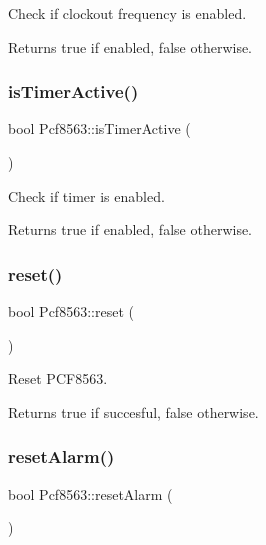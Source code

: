 Check if clockout frequency is enabled. 

\begin{DoxyReturn}{Returns}
true if enabled, false otherwise. 
\end{DoxyReturn}
\mbox{\label{namespacePcf8563_aab079fef811171abcba7e80b8595a8d1}} 
\subsubsection{\texorpdfstring{is\+Timer\+Active()}{isTimerActive()}}
{\footnotesize\ttfamily bool Pcf8563\+::is\+Timer\+Active (\begin{DoxyParamCaption}{ }\end{DoxyParamCaption})}



Check if timer is enabled. 

\begin{DoxyReturn}{Returns}
true if enabled, false otherwise. 
\end{DoxyReturn}
\mbox{\label{namespacePcf8563_abe54082b4f23e40ef4f5be845b5cf008}} 
\subsubsection{\texorpdfstring{reset()}{reset()}}
{\footnotesize\ttfamily bool Pcf8563\+::reset (\begin{DoxyParamCaption}{ }\end{DoxyParamCaption})}



Reset P\+C\+F8563. 

\begin{DoxyReturn}{Returns}
true if succesful, false otherwise. 
\end{DoxyReturn}
\mbox{\label{namespacePcf8563_ae554435cc17a3e49d9d731b97e3fc0be}} 
\subsubsection{\texorpdfstring{reset\+Alarm()}{resetAlarm()}}
{\footnotesize\ttfamily bool Pcf8563\+::reset\+Alarm (\begin{DoxyParamCaption}{ }\end{DoxyParamCaption})}



